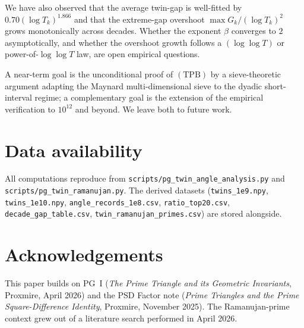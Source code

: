 \documentclass[11pt]{article}
\begin{document}
We have also observed that the average twin-gap is well-fitted by
$0.70(\log T_k)^{1.866}$ and that the extreme-gap overshoot
$\max G_k/(\log T_k)^2$ grows monotonically across decades. Whether
the exponent $\beta$ converges to $2$ asymptotically, and whether the
overshoot growth follows a $(\log\log T)$ or power-of-$\log\log T$
law, are open empirical questions.

A near-term goal is the unconditional proof of $(\mathrm{TPB})$ by a
sieve-theoretic argument adapting the Maynard multi-dimensional
sieve to the dyadic short-interval regime; a complementary goal is
the extension of the empirical verification to $10^{12}$ and beyond.
We leave both to future work.

\section*{Data availability}

All computations reproduce from
\texttt{scripts/pg\_twin\_angle\_analysis.py} and
\texttt{scripts/pg\_twin\_ramanujan.py}. The derived datasets
(\texttt{twins\_1e9.npy}, \texttt{twins\_1e10.npy},
\texttt{angle\_records\_1e8.csv}, \texttt{ratio\_top20.csv},
\texttt{decade\_gap\_table.csv},
\texttt{twin\_ramanujan\_primes.csv}) are stored alongside.

\section*{Acknowledgements}

This paper builds on PG~I (\emph{The Prime Triangle and its
Geometric Invariants}, Proxmire, April 2026) and the PSD Factor note
(\emph{Prime Triangles and the Prime Square-Difference Identity},
Proxmire, November 2025). The Ramanujan-prime context grew out of a
literature search performed in April 2026.
\end{document}
